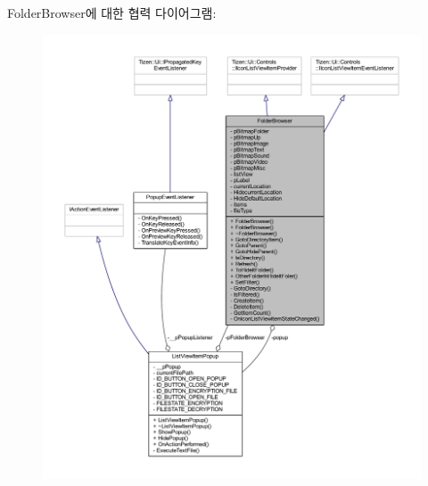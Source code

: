 Folder\+Browser에 대한 협력 다이어그램\+:
\nopagebreak
\begin{figure}[H]
\begin{center}
\leavevmode
\includegraphics[width=350pt]{class_folder_browser__coll__graph}
\end{center}
\end{figure}
